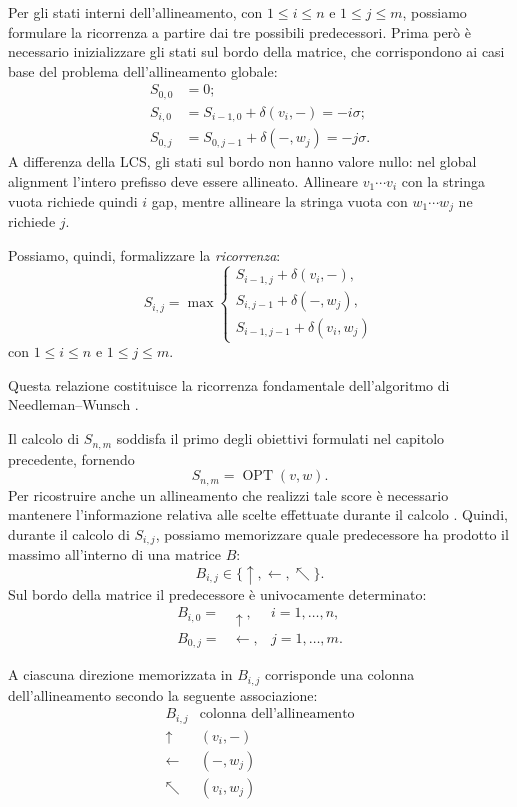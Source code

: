 Per gli stati interni dell'allineamento, con $1 \leq i \leq n$ e $1 \leq j \leq m$, possiamo formulare la ricorrenza a partire dai tre possibili predecessori.
Prima però è necessario inizializzare gli stati sul bordo della matrice, che corrispondono ai casi base del problema dell'allineamento globale:
\[
    \begin{aligned}
        S_{0,0}&=0; \\
        S_{i,0}&= S_{i-1,0}+ \delta( v_{i}, -)= -i\sigma;\\
        S_{0,j}&= S_{0,j-1}+ \delta(-, w_{j})= -j\sigma.
    \end{aligned} 
\]
A differenza della LCS, gli stati sul bordo non hanno valore nullo: nel global alignment l'intero prefisso deve essere allineato.
Allineare $v_{1}\cdots v_{i}$ con la stringa vuota richiede quindi $i$ gap, mentre allineare la stringa vuota con $w_{1}\cdots w_{j}$ ne richiede $j$.

Possiamo, quindi, formalizzare la \emph{ricorrenza}:
\[
    \boxed{
        S_{i,j}
        =
        \max
        \begin{cases}
            S_{i-1,j}+\delta(v_i,-),\\
            S_{i,j-1}+\delta(-,w_j),\\
            S_{i-1,j-1}+\delta(v_i,w_j)
        \end{cases}
    }
\]
con $1 \leq i \leq n$ e $1 \leq j \leq m$.

Questa relazione costituisce la ricorrenza fondamentale dell'algoritmo di Needleman--Wunsch
\cite[pp.~255--256]{compeau--pevzner}.

Il calcolo di $S_{n,m}$ soddisfa il primo degli obiettivi formulati nel capitolo precedente, fornendo
\[
    S_{n,m} = \operatorname{OPT}(v,w).
\]
Per ricostruire anche un allineamento che realizzi tale score è necessario mantenere l'informazione relativa alle scelte effettuate durante il calcolo
\cite[pp.~251--252]{compeau--pevzner}.
Quindi, durante il calcolo di $S_{i,j}$, possiamo memorizzare quale predecessore ha prodotto il massimo all'interno di una matrice $B$:
\[
    B_{i,j} \in \{ \uparrow, \leftarrow, \nwarrow \}.
\]
Sul bordo della matrice il predecessore è univocamente determinato:
\[
   \begin{aligned}
       B_{i,0}=&\uparrow,&i=1,\ldots,n,\\
       B_{0,j}=&\leftarrow,&j=1,\ldots,m.
   \end{aligned}
\]

A ciascuna direzione memorizzata in $B_{i,j}$ corrisponde una colonna dell'allineamento secondo la seguente associazione:
\[
    \begin{array}{c|c}
        B_{i,j} & \text{colonna dell'allineamento}\\
        \hline
        \uparrow & (v_i,-)\\
        \leftarrow & (-,w_j)\\
        \nwarrow & (v_i,w_j)
    \end{array}
\]

